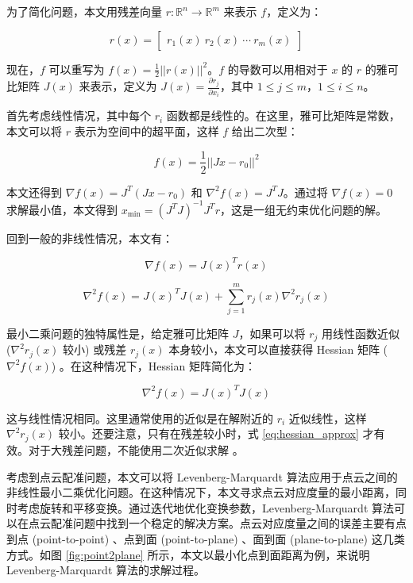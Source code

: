 为了简化问题，本文用残差向量 $r : \mathbb{R}^n \rightarrow \mathbb{R}^m$ 来表示 $f$，定义为：

\begin{equation}
r(x) =
\begin{bmatrix}
r_1(x) \
r_2(x) \
\cdots \
r_m(x)
\end{bmatrix}
\end{equation}

现在，$f$ 可以重写为 $f(x) = \frac{1}{2} ||r(x)||^2$。$f$ 的导数可以用相对于 $x$ 的 $r$ 的雅可比矩阵 $J(x)$ 来表示，定义为 $J(x) = \frac{\partial r_j}{\partial x_i}$，其中 $1 \leq j \leq m$，$1 \leq i \leq n$。

首先考虑线性情况，其中每个 $r_i$ 函数都是线性的。在这里，雅可比矩阵是常数，本文可以将 $r$ 表示为空间中的超平面，这样 $f$ 给出二次型：

\begin{equation}
f(x) = \frac{1}{2} ||Jx - r_0||^2
\end{equation}

本文还得到 $\nabla f(x) = J^T(Jx - r_0)$ 和 $\nabla^2 f(x) = J^TJ$。通过将 $\nabla f(x) = 0$ 求解最小值，本文得到 $x_\text{min} = (J^TJ)^{-1}J^Tr$，这是一组无约束优化问题的解。

回到一般的非线性情况，本文有：

\begin{equation}
\nabla f(x) = J(x)^T r(x)
\label{eq:grad}
\end{equation}

\begin{equation}
\nabla^2 f(x) = J(x)^TJ(x) + \sum_{j=1}^{m} r_j(x) \nabla^2 r_j(x)
\label{eq:hessian}
\end{equation}

最小二乘问题的独特属性是，给定雅可比矩阵 $J$，如果可以将 $r_j$ 用线性函数近似 ($\nabla^2 r_j(x)$ 较小) 或残差 $r_j(x)$ 本身较小，本文可以直接获得 Hessian 矩阵 ($\nabla^2 f(x)$) 。在这种情况下，Hessian 矩阵简化为：

\begin{equation}
\nabla^2 f(x) = J(x)^T J(x)
\label{eq:hessian_approx}
\end{equation}

这与线性情况相同。这里通常使用的近似是在解附近的 $r_i$ 近似线性，这样 $\nabla^2 r_j(x)$ 较小。还要注意，只有在残差较小时，式 \ref{eq:hessian_approx} 才有效。对于大残差问题，不能使用二次近似求解\cite{李娇娇2022基于深度学习的} 。

考虑到点云配准问题，本文可以将 Levenberg-Marquardt 算法应用于点云之间的非线性最小二乘优化问题。在这种情况下，本文寻求点云对应度量的最小距离，同时考虑旋转和平移变换。通过迭代地优化变换参数，Levenberg-Marquardt 算法可以在点云配准问题中找到一个稳定的解决方案。点云对应度量之间的误差主要有点到点 (point-to-point) 、点到面 (point-to-plane) 、面到面 (plane-to-plane) 这几类方式。如图 \ref{fig:point2plane} 所示，本文以最小化点到面距离为例，来说明 Levenberg-Marquardt 算法的求解过程。

